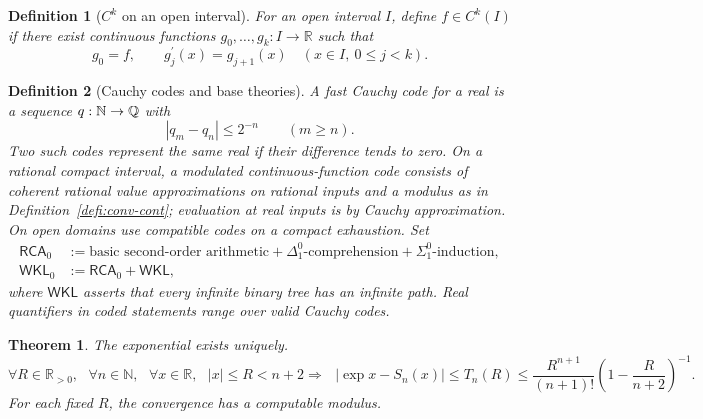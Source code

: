 \documentclass[11pt,reqno]{amsart}
\theoremstyle{redplain}
\newtheorem{theorem}{Theorem}[section]
\newtheorem{definition}{Definition}[section]
\numberwithin{equation}{section}
\begin{document}
\begin{definition}[$C^{k}$ on an open interval]
For an open interval $I$, define $f\in C^{k}(I)$ if there exist continuous
functions $g_{0},\ldots ,g_{k}:I\rightarrow \mathbb{R}$ such that 
\begin{equation}
g_{0}=f,\qquad g_{j}^{\prime }(x)=g_{j+1}(x)\quad (x\in I,\ 0\leq j<k).
\end{equation}
\end{definition}

\begin{definition}[Cauchy codes and base theories]
A fast Cauchy code for a real is a sequence $q:\mathbb{N}\rightarrow \mathbb{%
Q}$ with 
\begin{equation}
|q_{m}-q_{n}|\leq 2^{-n}\qquad (m\geq n).
\end{equation}%
Two such codes represent the same real if their difference tends to zero. On
a rational compact interval, a modulated continuous-function code consists
of coherent rational value approximations on rational inputs and a modulus
as in Definition~\ref{defi:conv-cont}; evaluation at real inputs is by
Cauchy approximation. On open domains use compatible codes on a compact
exhaustion. Set 
\begin{equation*}
\begin{aligned} \mathsf{RCA}_0&:=\text{basic second-order arithmetic}
+\Delta^0_1\text{-comprehension}+\Sigma^0_1\text{-induction},\\
\mathsf{WKL}_0&:=\mathsf{RCA}_0+\mathsf{WKL}, \end{aligned}
\end{equation*}%
where $\mathsf{WKL}$ asserts that every infinite binary tree has an infinite
path. Real quantifiers in coded statements range over valid Cauchy codes.
\end{definition}



\label{sec:constructive}

\begin{theorem}
\label{thm:uniform-tail} The exponential exists uniquely. {\scriptsize 
\begin{equation}
\forall R\in 
\mathbb{R}
_{>0},\text{ }\forall n\in 
\mathbb{N}
,\text{ }\forall x\in 
\mathbb{R}
,\text{ }|x|\leq R<n+2\Rightarrow \text{ }|\exp x-S_{n}(x)|\leq T_{n}(R)\leq 
\frac{R^{n+1}}{(n+1)!}\left( 1-\frac{R}{n+2}\right) ^{-1}.
\label{eq:uniform-tail}
\end{equation}%
} For each fixed $R$, the convergence has a computable modulus.
\end{theorem}
\end{document}
